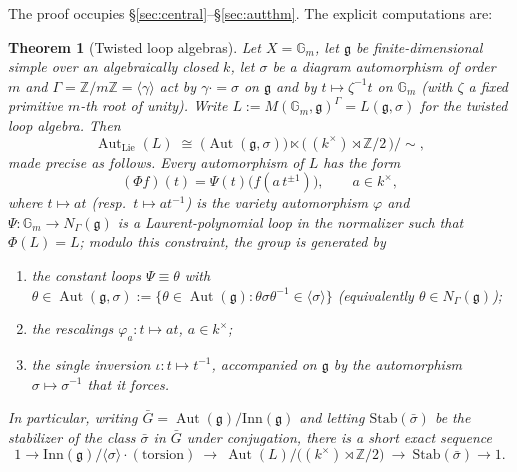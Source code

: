 \documentclass{amsart}
\newtheorem{theorem}{Theorem}
\theoremstyle{definition}
\DeclareMathOperator{\Aut}{Aut}
\newcommand{\Gm}{\mathbb{G}_m}
\newcommand{\g}{\mathfrak{g}}
\newcommand{\Z}{\mathbb{Z}}
\newcommand{\M}{M}
\begin{document}
The proof occupies \S\ref{sec:central}--\S\ref{sec:autthm}.  The
explicit computations are:

\begin{theorem}[Twisted loop algebras]\label{thm:loop}
Let $X=\Gm$, let $\g$ be finite-dimensional simple over an algebraically
closed $k$, let $\sigma$ be a diagram automorphism of order $m$ and
$\Gamma=\Z/m\Z=\langle\gamma\rangle$ act by $\gamma\cdot=\sigma$ on $\g$ and
by $t\mapsto\zeta^{-1}t$ on $\Gm$ (with $\zeta$ a fixed primitive $m$-th root
of unity).  Write $L:=\M(\Gm,\g)^\Gamma=L(\g,\sigma)$ for the twisted loop
algebra.  Then
\[
\Aut_{\mathrm{Lie}}(L)\;\cong\;
\bigl(\Aut(\g,\sigma)\bigr)\ltimes
\bigl(\,(k^\times)\rtimes\Z/2\,\bigr)\big/\!\sim ,
\]
made precise as follows.  Every automorphism of $L$ has the form
\begin{equation}\label{eq:loopaut}
(\Phi f)(t)=\Psi(t)\bigl(f(a\,t^{\pm1})\bigr),\qquad a\in k^\times,
\end{equation}
where $t\mapsto a t$ (resp.\ $t\mapsto a t^{-1}$) is the variety
automorphism $\varphi$ and $\Psi\colon\Gm\to N_\Gamma(\g)$ is a
Laurent-polynomial loop in the normalizer such that $\Phi(L)=L$; modulo
this constraint, the group is generated by
\begin{enumerate}
\item the constant loops $\Psi\equiv\theta$ with $\theta\in\Aut(\g,\sigma):=\{
\theta\in\Aut(\g):\theta\sigma\theta^{-1}\in\langle\sigma\rangle\}$
(equivalently $\theta\in N_\Gamma(\g)$);
\item the rescalings $\varphi_a\colon t\mapsto a t$, $a\in k^\times$;
\item the single inversion $\iota\colon t\mapsto t^{-1}$, accompanied on
$\g$ by the automorphism $\sigma\mapsto\sigma^{-1}$ that it forces.
\end{enumerate}
In particular, writing $\bar G=\Aut(\g)/\mathrm{Inn}(\g)$ and letting
$\mathrm{Stab}(\bar\sigma)$ be the stabilizer of the class $\bar\sigma$ in
$\bar G$ under conjugation, there is a short exact sequence
\[
1\to \mathrm{Inn}(\g)\big/\langle\sigma\rangle\!\cdot\!(\text{torsion})\ \to\
\Aut(L)/\bigl((k^\times)\!\rtimes\!\Z/2\bigr)\ \to\
\mathrm{Stab}(\bar\sigma)\to1 .
\]
\end{theorem}
\end{document}
